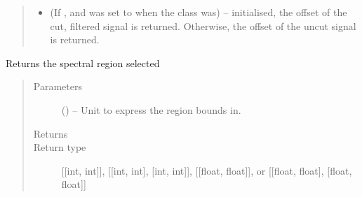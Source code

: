 \documentclass[letterpaper,10pt,english]{sphinxmanual}
\begin{document}
\begin{fulllineitems}
\begin{fulllineitems}
\begin{quote}
\begin{description}
\begin{itemize}
\item {} 
\sphinxAtStartPar
{} (If , and  was set to  when the class was) – initialised, the offset of the cut, filtered signal is
returned. Otherwise, the offset of the uncut signal is
returned.

\end{itemize}

\end{description}\end{quote}

\end{fulllineitems}


\begin{fulllineitems}
\label{\detokenize{references/freqfilter:nmrespy.freqfilter.FrequencyFilter.get_region}}
\sphinxAtStartPar
Returns the spectral region selected
\begin{quote}\begin{description}
\item[{Parameters}] \leavevmode
\sphinxAtStartPar
{} (\sphinxstyleliteralemphasis{\sphinxupquote{, }}\sphinxstyleliteralemphasis{\sphinxupquote{, }}\sphinxstyleliteralemphasis{\sphinxupquote{, }}) – Unit to express the region bounds in.

\item[{Returns}] \leavevmode
\sphinxAtStartPar
{}

\item[{Return type}] \leavevmode
\sphinxAtStartPar
{[}{[}int, int{]}{]}, {[}{[}int, int{]}, {[}int, int{]}{]}, {[}{[}float, float{]}{]},        or {[}{[}float, float{]}, {[}float, float{]}{]}

\end{description}\end{quote}

\end{fulllineitems}


\end{fulllineitems}
\end{document}

